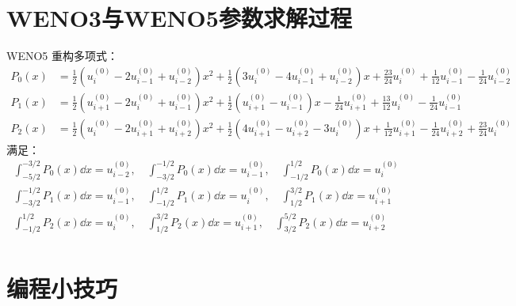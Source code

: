 \documentclass{book}
\begin{document}
\section{WENO3与WENO5参数求解过程}
WENO5 重构多项式：
\begin{equation}
    \begin{aligned}
        P_0(x) & = \frac{1}{2} \left(u_{i}^{(0)} - 2 u_{i-1}^{(0)} + u_{i-2}^{(0)}\right)x^2 + \frac{1}{2} \left(3  u_{i}^{(0)} - 4 u_{i-1}^{(0)} + u_{i-2}^{(0)}\right)  x + \frac{23}{24}u_{i}^{(0)} +\frac{1}{12} u_{i-1}^{(0)} -\frac{1}{24} u_{i-2}^{(0)}        \\
        P_1(x) & = \frac{1}{2} \left(u_{i+1}^{(0)} - 2  u_{i}^{(0)} + u_{i-1}^{(0)}\right)x^2 + \frac{1}{2}  \left(u_{i+1}^{(0)} - u_{i-1}^{(0)}\right)  x -\frac{1}{24}  u_{i+1}^{(0)} + \frac{13}{12}  u_{i}^{(0)} -\frac{1}{24}  u_{i-1}^{(0)}                     \\
        P_2(x) & = \frac{1}{2}  \left(u_{i}^{(0)} - 2  u_{i+1}^{(0)} + u_{i+2}^{(0)}\right)x^2 + \frac{1}{2}\left(4  u_{i+1}^{(0)} - u_{i+2}^{(0)} - 3  u_{i}^{(0)}\right)  x + \frac{1}{12}  u_{i+1}^{(0)} -\frac{1}{24}  u_{i+2}^{(0)} + \frac{23}{24}  u_{i}^{(0)}
    \end{aligned}
\end{equation}
满足：
\begin{equation}
    \begin{aligned}
        \int_{-5/2}^{-3/2} P_0(x)\dd x = u_{i-2}^{(0)},\quad \int_{-3/2}^{-1/2} P_0(x)\dd x = u_{i-1}^{(0)},\quad \int_{-1/2}^{1/2} P_0(x)\dd x = u_{i}^{(0)} \\
        \int_{-3/2}^{-1/2} P_1(x)\dd x = u_{i-1}^{(0)},\quad \int_{-1/2}^{1/2} P_1(x)\dd x = u_{i}^{(0)},\quad \int_{1/2}^{3/2} P_1(x)\dd x = u_{i+1}^{(0)}   \\
        \int_{-1/2}^{1/2} P_2(x)\dd x = u_{i}^{(0)},\quad \int_{1/2}^{3/2} P_2(x)\dd x = u_{i+1}^{(0)},\quad \int_{3/2}^{5/2} P_2(x)\dd x = u_{i+2}^{(0)}     \\
    \end{aligned}
\end{equation}






\section{编程小技巧}
\end{document}
